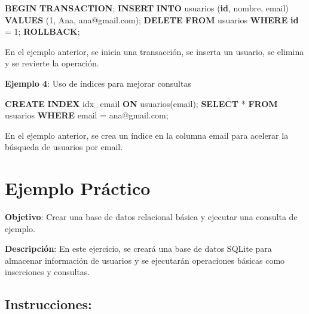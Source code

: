 \documentclass[
  a4paper,
  DIV=11,
  numbers=noendperiod,
  onepage,
  openany]{scrreprt}
\newenvironment{Shaded}{\begin{snugshade}}{\end{snugshade}}
\newcommand{\ControlFlowTok}[1]{\textcolor[rgb]{0.00,0.23,0.31}{\textbf{#1}}}
\newcommand{\DecValTok}[1]{\textcolor[rgb]{0.68,0.00,0.00}{#1}}
\newcommand{\KeywordTok}[1]{\textcolor[rgb]{0.00,0.23,0.31}{\textbf{#1}}}
\newcommand{\NormalTok}[1]{\textcolor[rgb]{0.00,0.23,0.31}{#1}}
\newcommand{\OperatorTok}[1]{\textcolor[rgb]{0.37,0.37,0.37}{#1}}
\newcommand{\StringTok}[1]{\textcolor[rgb]{0.13,0.47,0.30}{#1}}
\begin{document}
\begin{Shaded}
\begin{Highlighting}[]
\ControlFlowTok{BEGIN} \KeywordTok{TRANSACTION}\NormalTok{;}
\KeywordTok{INSERT} \KeywordTok{INTO}\NormalTok{ usuarios (}\KeywordTok{id}\NormalTok{, nombre, email) }\KeywordTok{VALUES}\NormalTok{ (}\DecValTok{1}\NormalTok{, }\StringTok{\textquotesingle{}Ana\textquotesingle{}}\NormalTok{, }\StringTok{\textquotesingle{}ana@gmail.com\textquotesingle{}}\NormalTok{);}
\KeywordTok{DELETE} \KeywordTok{FROM}\NormalTok{ usuarios }\KeywordTok{WHERE} \KeywordTok{id} \OperatorTok{=} \DecValTok{1}\NormalTok{;}
\KeywordTok{ROLLBACK}\NormalTok{;}
\end{Highlighting}
\end{Shaded}

En el ejemplo anterior, se inicia una transacción, se inserta un
usuario, se elimina y se revierte la operación.

\textbf{Ejemplo 4}: Uso de índices para mejorar consultas

\begin{Shaded}
\begin{Highlighting}[]
\KeywordTok{CREATE} \KeywordTok{INDEX}\NormalTok{ idx\_email }\KeywordTok{ON}\NormalTok{ usuarios(email);}
\KeywordTok{SELECT} \OperatorTok{*} \KeywordTok{FROM}\NormalTok{ usuarios }\KeywordTok{WHERE}\NormalTok{ email }\OperatorTok{=} \StringTok{\textquotesingle{}ana@gmail.com\textquotesingle{}}\NormalTok{;}
\end{Highlighting}
\end{Shaded}

En el ejemplo anterior, se crea un índice en la columna email para
acelerar la búsqueda de usuarios por email.

\section{Ejemplo Práctico}\label{ejemplo-pruxe1ctico-11}

\textbf{Objetivo}: Crear una base de datos relacional básica y ejecutar
una consulta de ejemplo.

\textbf{Descripción}: En este ejercicio, se creará una base de datos
SQLite para almacenar información de usuarios y se ejecutarán
operaciones básicas como inserciones y consultas.

\subsection{Instrucciones:}\label{instrucciones-4}
\end{document}
